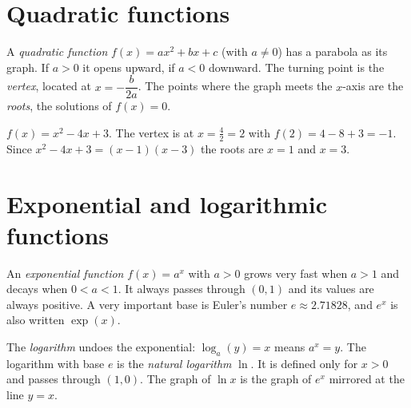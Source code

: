 \section*{Quadratic functions}
A \emph{quadratic function} $f(x)=ax^2+bx+c$ (with $a\neq0$) has a parabola as its graph. If $a>0$ it opens upward, if $a<0$ downward. The turning point is the \emph{vertex}, located at $x=-\dfrac{b}{2a}$. The points where the graph meets the $x$-axis are the \emph{roots}, the solutions of $f(x)=0$.

\begin{center}

\label{fig:b1_4}
\end{center}

\begin{example}
$f(x)=x^2-4x+3$. The vertex is at $x=\frac{4}{2}=2$ with $f(2)=4-8+3=-1$. Since $x^2-4x+3=(x-1)(x-3)$ the roots are $x=1$ and $x=3$.
\end{example}

\section*{Exponential and logarithmic functions}
An \emph{exponential function} $f(x)=a^x$ with $a>0$ grows very fast when $a>1$ and decays when $0<a<1$. It always passes through $(0,1)$ and its values are always positive. A very important base is Euler's number $e\approx2.71828$, and $e^x$ is also written $\exp(x)$.

The \emph{logarithm} undoes the exponential: $\log_a(y)=x$ means $a^x=y$. The logarithm with base $e$ is the \emph{natural logarithm} $\ln$. It is defined only for $x>0$ and passes through $(1,0)$. The graph of $\ln x$ is the graph of $e^x$ mirrored at the line $y=x$.

